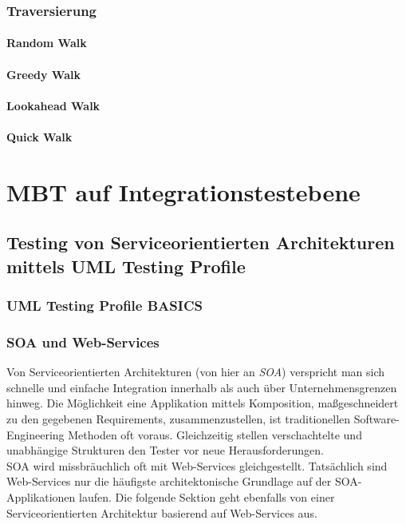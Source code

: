 \subsubsection{Traversierung}
\paragraph{Random Walk}
\paragraph{Greedy Walk}
\paragraph{Lookahead Walk}
\paragraph{Quick Walk}


\section{MBT auf Integrationstestebene}
\subsection{Testing von Serviceorientierten Architekturen mittels UML Testing Profile}

\subsubsection{UML Testing Profile BASICS}

\subsubsection{SOA und Web-Services}
Von Serviceorientierten Architekturen (von hier an \textit{SOA}) verspricht man sich schnelle und einfache Integration innerhalb als auch über Unternehmensgrenzen hinweg. Die Möglichkeit eine Applikation mittels Komposition, maßgeschneidert zu den gegebenen Requirements, zusammenzustellen, ist traditionellen Software-Engineering Methoden oft voraus. Gleichzeitig stellen verschachtelte und unabhängige Strukturen den Tester vor neue Herausforderungen. \\
SOA wird missbräuchlich oft mit Web-Services gleichgestellt. Tatsächlich sind Web-Services nur die häufigste architektonische Grundlage auf der SOA-Applikationen laufen. Die folgende Sektion geht ebenfalls von einer Serviceorientierten Architektur basierend auf Web-Services aus.

